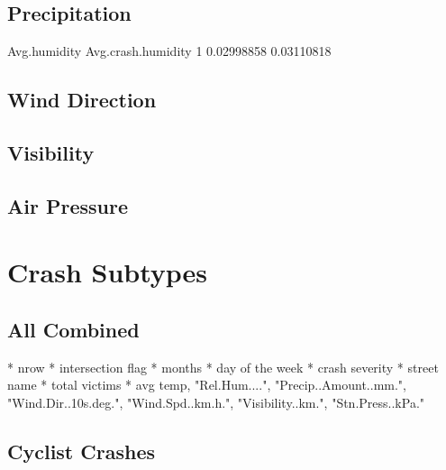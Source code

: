 \documentclass[11pt, a4paper]{article}
\begin{document}
\pagebreak
\subsection{Precipitation}

\begin{Schunk}
\begin{Soutput}
  Avg.humidity Avg.crash.humidity
1   0.02998858         0.03110818
\end{Soutput}
\end{Schunk}




\pagebreak
\subsection{Wind Direction}





\pagebreak
\subsection{Visibility}





\pagebreak
\subsection{Air Pressure}









\section{Crash Subtypes}

\subsection{All Combined}

* nrow
* intersection flag
* months
* day of the week
* crash severity
* street name
* total victims
* avg temp, "Rel.Hum....", "Precip..Amount..mm.", 
"Wind.Dir..10s.deg.", "Wind.Spd..km.h.", "Visibility..km.", "Stn.Press..kPa."


\pagebreak
\subsection{Cyclist Crashes}
\end{document}
